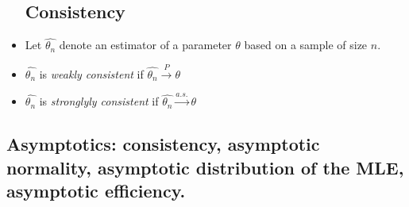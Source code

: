 \documentclass[12pt]{report} \addtolength{\textheight}{2in}
\newcommand{\asto}{\overset{a.s.}{\longrightarrow}}
\newcommand{\pto}{\overset{P}{\longrightarrow}}
\begin{document}
\begin{itemize}
\subsection*{Consistency}
\item Let $\hat{\theta_n}$ denote an estimator of a parameter $\theta$ based on a sample of size $n$. 
\item $\hat{\theta_n}$ is \textit{weakly consistent} if $\hat{\theta_{n}} \pto \theta$
\item $\hat{\theta_n}$ is \textit{stronglyly consistent} if $\hat{\theta_{n}} \asto \theta$

\end{itemize}


\subsection*{Asymptotics: consistency, asymptotic normality, asymptotic distribution of the MLE, asymptotic efficiency.}
\end{document}
